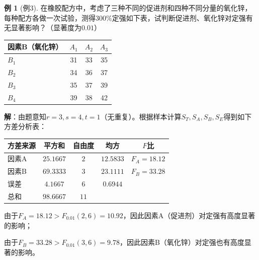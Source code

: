 \documentclass[11pt,a4paper]{report}
\theoremstyle{definition}
\newtheorem{example}{例}[chapter]
\theoremstyle{plain}
\begin{document}
\begin{example}[例3]
在橡胶配方中，考虑了三种不同的促进剂和四种不同分量的氧化锌，每种配方各做一次试验，测得$300\%$定强如下表，试判断促进剂、氧化锌对定强有无显著影响？（显著度为$0.01$）
\begin{center}
\begin{tabular}{@{}lccc@{}}
\toprule
因素B（氧化锌） & $A_1$ & $A_2$ & $A_3$ \\
\midrule
$B_1$ & 31 & 33 & 35 \\
$B_2$ & 34 & 36 & 37 \\
$B_3$ & 35 & 37 & 39 \\
$B_4$ & 39 & 38 & 42 \\
\bottomrule
\end{tabular}
\end{center}

\textbf{解}：由题意知$r=3,s=4,t=1$（无重复）。根据样本计算$S_T,S_A,S_B,S_E$得到如下方差分析表：
\begin{center}
\begin{tabular}{@{}lcccc@{}}
\toprule
方差来源 & 平方和 & 自由度 & 均方 & $F$比 \\
\midrule
因素A & $25.1667$ & $2$ & $12.5833$ & $F_A=18.12$ \\
因素B & $69.3333$ & $3$ & $23.1111$ & $F_B=33.28$ \\
误差 & $4.1667$ & $6$ & $0.6944$ & \\
总和 & $98.6667$ & $11$ & & \\
\bottomrule
\end{tabular}
\end{center}

由于$F_A=18.12>F_{0.01}(2,6)=10.92$，因此因素A（促进剂）对定强有高度显著的影响；

由于$F_B=33.28>F_{0.01}(3,6)=9.78$，因此因素B（氧化锌）对定强也有高度显著的影响。
\end{example}
\end{document}
